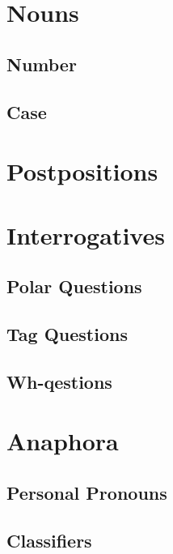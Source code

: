 \documentclass[11pt,a4paper,titlepage]{article}
\begin{document}
	\section{Nouns}
		\lipsum[1]
		\subsection{Number}
			\lipsum[1]
		\subsection{Case}
			\lipsum[1]
	\section{Postpositions}
		\lipsum[1]
	\section{Interrogatives}
		\lipsum[1]
		\subsection{Polar Questions}
			\lipsum[1]
		\subsection{Tag Questions}
		\subsection{Wh-qestions}
	\section{Anaphora}
		\subsection{Personal Pronouns}
		\subsection{Classifiers}
\end{document}
